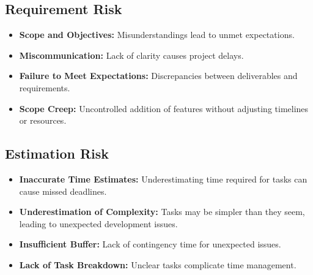 \vspace{0.5cm}

\subsection{Requirement Risk}
\begin{itemize}
    \item \textbf{Scope and Objectives:} Misunderstandings lead to unmet expectations.
    \item \textbf{Miscommunication:} Lack of clarity causes project delays.
    \item \textbf{Failure to Meet Expectations:} Discrepancies between deliverables and requirements.
    \item \textbf{Scope Creep:} Uncontrolled addition of features without adjusting timelines or resources.
\end{itemize}

\vspace{0.5cm}

\subsection{Estimation Risk}
\begin{itemize}
    \item \textbf{Inaccurate Time Estimates:} Underestimating time required for tasks can cause missed deadlines.
    \item \textbf{Underestimation of Complexity:} Tasks may be simpler than they seem, leading to unexpected development issues.
    \item \textbf{Insufficient Buffer:} Lack of contingency time for unexpected issues.
    \item \textbf{Lack of Task Breakdown:} Unclear tasks complicate time management.
\end{itemize}

\vspace{0.5cm}

